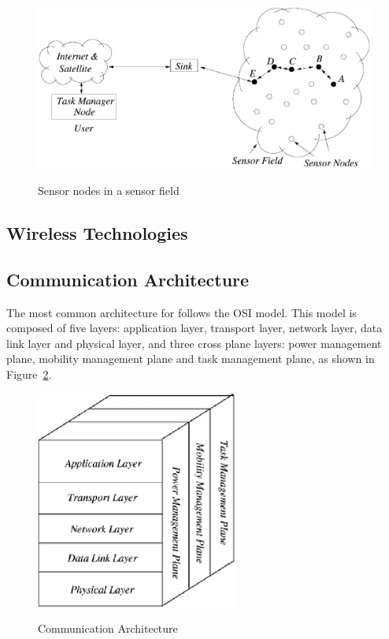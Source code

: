 \begin{figure}[H]
      \caption{Sensor nodes in a sensor field \cite{Akyildiz2002}}
      \centering
      \includegraphics[scale=0.5]{Chapters/Figures/sensor_nodes_in_sensor_fields.png}
      \label{fig:sensor_nodes_in_sensor_fields}
\end{figure}


\subsection{Wireless Technologies}
\label{subsec:wsn_wireless_technologies}


\subsection{Communication Architecture}
\label{subsec:wsn_communication_architecture}
The most common architecture for  follows the OSI model. This model is
composed of five layers: application layer, transport layer, network layer, data link layer
and physical layer, and three cross plane layers: power management plane, mobility management
plane and task management plane, as shown in Figure~\ref{fig:wsn_architecture}.

\begin{figure}[H]
      \caption{ Communication Architecture \cite{Akyildiz2002}}
      \centering
      \includegraphics[scale=0.5]{Chapters/Figures/wsn_architecture.png}
      \label{fig:wsn_architecture}
\end{figure}

